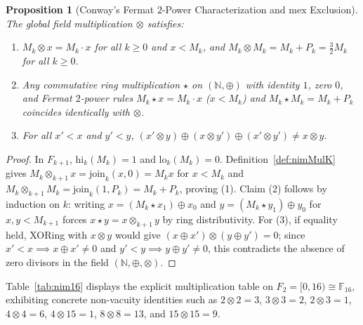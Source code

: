 \documentclass[11pt]{article}
\newtheorem{proposition}[theorem]{Proposition}
\theoremstyle{definition}
\theoremstyle{remark}
\newcommand{\nimadd}{\oplus}
\newcommand{\nimmul}{\otimes}
\newcommand{\F}{\mathbb{F}}
\newcommand{\N}{\mathbb{N}}
\begin{document}
\begin{proposition}[Conway's Fermat $2$-Power Characterization and $\mathrm{mex}$ Exclusion]\label{prop:conway}
The global field multiplication $\nimmul$ satisfies:
\begin{enumerate}
  \item $M_k \nimmul x = M_k \cdot x$ for all $k \ge 0$ and $x < M_k$, and $M_k \nimmul M_k = M_k + P_k = \frac{3}{2} M_k$ for all $k \ge 0$.
  \item Any commutative ring multiplication $\star$ on $(\N, \nimadd)$ with identity $1$, zero $0$, and Fermat $2$-power rules $M_k \star x = M_k \cdot x$ ($x < M_k$) and $M_k \star M_k = M_k + P_k$ coincides identically with $\nimmul$.
  \item For all $x' < x$ and $y' < y$, $(x' \nimmul y) \nimadd (x \nimmul y') \nimadd (x' \nimmul y') \neq x \nimmul y$.
\end{enumerate}
\end{proposition}

\begin{proof}
In $F_{k+1}$, $\mathrm{hi}_k(M_k) = 1$ and $\mathrm{lo}_k(M_k) = 0$. Definition~\ref{def:nimMulK} gives $M_k \nimmul_{k+1} x = \mathrm{join}_k(x, 0) = M_k x$ for $x < M_k$ and $M_k \nimmul_{k+1} M_k = \mathrm{join}_k(1, P_k) = M_k + P_k$, proving (1). Claim (2) follows by induction on $k$: writing $x = (M_k \star x_1) \nimadd x_0$ and $y = (M_k \star y_1) \nimadd y_0$ for $x, y < M_{k+1}$ forces $x \star y = x \nimmul_{k+1} y$ by ring distributivity. For (3), if equality held, XORing with $x \nimmul y$ would give $(x \nimadd x') \nimmul (y \nimadd y') = 0$; since $x' < x \implies x \nimadd x' \neq 0$ and $y' < y \implies y \nimadd y' \neq 0$, this contradicts the absence of zero divisors in the field $(\N, \nimadd, \nimmul)$.
\end{proof}

Table~\ref{tab:nim16} displays the explicit multiplication table on $F_2 = [0, 16) \cong \F_{16}$, exhibiting concrete non-vacuity identities such as $2 \nimmul 2 = 3$, $3 \nimmul 3 = 2$, $2 \nimmul 3 = 1$, $4 \nimmul 4 = 6$, $4 \nimmul 15 = 1$, $8 \nimmul 8 = 13$, and $15 \nimmul 15 = 9$.
\end{document}
